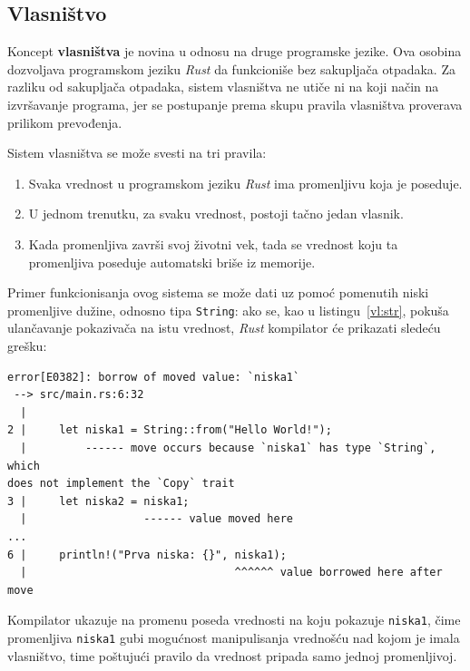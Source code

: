 \documentclass[12pt,oneside]{memoir}
\begin{document}
\subsection{Vlasništvo}
Koncept \textbf{vlasništva} je novina u odnosu na druge programske jezike. Ova
osobina dozvoljava programskom jeziku \emph{Rust} da funkcioniše bez sakupljača
otpadaka. Za razliku od sakupljača otpadaka, sistem vlasništva ne utiče ni na
koji način na izvršavanje programa, jer se postupanje prema skupu pravila
vlasništva proverava prilikom prevođenja.

Sistem vlasništva se može svesti na tri pravila:

\begin{enumerate}
  \item Svaka vrednost u programskom jeziku \emph{Rust} ima promenljivu koja
        je poseduje.
  \item U jednom trenutku, za svaku vrednost, postoji tačno jedan vlasnik.
  \item Kada promenljiva završi svoj životni vek, tada se vrednost
        koju ta promenljiva poseduje automatski briše iz memorije.
\end{enumerate}

Primer funkcionisanja ovog sistema se može dati uz pomoć pomenutih niski promenljive dužine,
odnosno tipa \texttt{String}: ako se, kao u listingu~\ref{vl:str}, pokuša
ulančavanje pokazivača na istu vrednost, \textit{Rust} kompilator će prikazati sledeću grešku:

\begin{lstlisting}[language={}, style=text]
error[E0382]: borrow of moved value: `niska1`
 --> src/main.rs:6:32
  |
2 |     let niska1 = String::from("Hello World!");
  |         ------ move occurs because `niska1` has type `String`, which
does not implement the `Copy` trait
3 |     let niska2 = niska1;
  |                  ------ value moved here
...
6 |     println!("Prva niska: {}", niska1);
  |                                ^^^^^^ value borrowed here after move
\end{lstlisting}

Kompilator ukazuje na promenu poseda vrednosti na koju pokazuje \texttt{niska1}, čime promenljiva
\texttt{niska1} gubi mogućnost manipulisanja vrednošću nad kojom je imala vlasništvo, time poštujući
pravilo da vrednost pripada samo jednoj promenljivoj.


\end{document}
